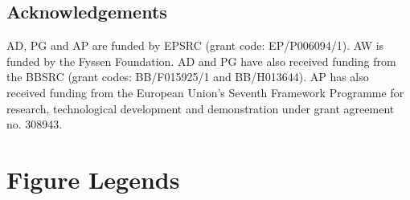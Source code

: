 \subsection*{Acknowledgements}
AD, PG and AP are funded by EPSRC (grant code: EP/P006094/1).
AW is funded by the Fyssen Foundation.
AD and PG have also received funding from the BBSRC (grant codes: BB/F015925/1 and BB/H013644).
AP has also received funding from the European Union’s Seventh Framework Programme for research, technological development and demonstration under grant agreement no. 308943.



\section*{Figure Legends}
%
